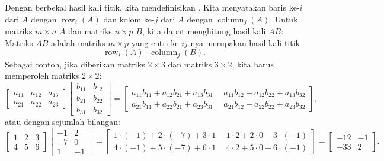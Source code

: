 Dengan berbekal hasil kali titik, kita mendefinisikan
\emph{}.
Kita menyatakan baris ke-$i$ dari $A$ dengan $\operatorname{row}_i(A)$
dan kolom ke-$j$ dari $A$ dengan
$\operatorname{column}_j(A)$.
Untuk matriks $m \times n$ $A$ dan matriks $n \times p$ $B$,
kita dapat menghitung hasil kali $AB$: Matriks $AB$ adalah matriks $m \times p$
yang entri ke-$ij$-nya merupakan hasil kali titik
\begin{equation*}
\operatorname{row}_i(A) \cdot
\operatorname{column}_j(B) .
\end{equation*}
Sebagai contoh, jika diberikan matriks $2 \times 3$ dan matriks $3 \times 2$,
kita harus memperoleh matriks $2 \times 2$:
\begin{equation} \label{linalg:eqmatrixmulex}
\begin{bmatrix}
a_{11} & a_{12} & a_{13} \\
a_{21} & a_{22} & a_{23}
\end{bmatrix}
\begin{bmatrix}
b_{11} & b_{12} \\
b_{21} & b_{22} \\
b_{31} & b_{32}
\end{bmatrix}
=
\begin{bmatrix}
a_{11} b_{11} +
a_{12} b_{21} +
a_{13} b_{31} & ~~
a_{11} b_{12} +
a_{12} b_{22} +
a_{13} b_{32} \\
a_{21} b_{11} +
a_{22} b_{21} +
a_{23} b_{31} & ~~
a_{21} b_{12} +
a_{22} b_{22} +
a_{23} b_{32}
\end{bmatrix} ,
\end{equation}
atau dengan sejumlah bilangan:
\begin{equation*}
\begin{bmatrix}
1 & 2 & 3 \\
4 & 5 & 6
\end{bmatrix}
\begin{bmatrix}
-1 & 2 \\
-7 & 0 \\
1 & -1
\end{bmatrix}
=
\begin{bmatrix}
1\cdot (-1) + 2\cdot (-7) + 3 \cdot 1 & ~~
1\cdot 2 + 2\cdot 0 + 3 \cdot (-1) \\
4\cdot (-1) + 5\cdot (-7) + 6 \cdot 1 & ~~
4\cdot 2 + 5\cdot 0 + 6 \cdot (-1)
\end{bmatrix}
=
\begin{bmatrix}
-12 & -1 \\
-33 & 2
\end{bmatrix} .
\end{equation*}

